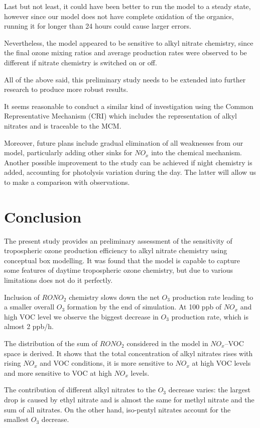 \documentclass[11pt,a4paper]{article}
\begin{document}
Last but not least, it could have been better to run the model to a steady state, however since our model does not have complete oxidation of the organics, running it for longer than 24 hours could cause larger errors.

Nevertheless, the model appeared to be sensitive to alkyl nitrate chemistry, since the final ozone mixing ratios and average production rates were observed to be different if nitrate chemistry is switched on or off. 

All of the above said, this preliminary study needs to be extended into further research to produce more robust results.

It seems reasonable to conduct a similar kind of investigation using the Common Representative Mechanism (CRI) which includes the representation of alkyl nitrates and is traceable to the MCM.

Moreover, future plans include gradual elimination of all weaknesses from our model, particularly adding other sinks for $NO_x$ into the chemical mechanism. Another possible improvement to the study can be achieved if night chemistry is added, accounting for photolysis variation during the day. The latter will allow us to make a comparison with observations.

\section{Conclusion} \label{sec:conclusion}
The present study provides an preliminary assessment of the sensitivity of tropospheric ozone production efficiency to alkyl nitrate chemistry using conceptual box modelling. It was found that the model is capable to capture some features of daytime tropospheric ozone chemistry, but due to various limitations does not do it perfectly.

Inclusion of $RONO_2$ chemistry slows down the net $O_3$ production rate leading to a smaller overall $O_3$ formation by the end of simulation. At 100 ppb of $NO_x$ and high VOC level we observe the biggest decrease in $O_3$ production rate, which is almost 2 ppb/h.

The distribution of the sum of $RONO_2$ considered in the model in $NO_x$--VOC space is derived. It shows that the total concentration of alkyl nitrates rises with rising $NO_x$ and VOC conditions, it is more sensitive to $NO_x$ at high VOC levels and more sensitive to VOC at high $NO_x$ levels.

The contribution of different alkyl nitrates to the $O_3$ decrease varies: the largest drop is caused by ethyl nitrate and is almost the same for methyl nitrate and the sum of all nitrates. On the other hand, iso-pentyl nitrates account for the smallest $O_3$ decrease.
\end{document}
